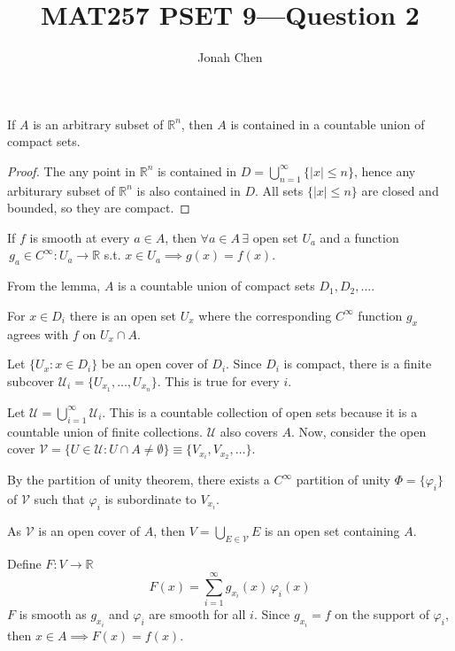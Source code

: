 \documentclass{exam}
\title{MAT257 PSET 9---Question 2}
\author{Jonah Chen}
\date{}
\numberwithin{equation}{section}
\newcommand{\R}{\mathbb{R}}
\begin{document}
    \sffamily
    \maketitle
    \begin{lemma}
        If $A$ is an arbitrary subset of $\R^n$, then $A$ is contained in a countable union of compact sets.
        \begin{proof}
            The any point in $\R^n$ is contained in $D=\bigcup_{n=1}^\infty\{|x|\leq n\}$, hence any arbiturary subset of $\R^n$ is also contained in $D$. All sets $\{|x|\leq n\}$ are closed and bounded, so they are compact.
        \end{proof}
    \end{lemma}
    If $f$ is smooth at every $a\in A$, then $\forall a\in A\,\exists$ open set $U_a$ and a function $\,g_a\in C^\infty:U_a\to\R$ s.t. $x\in U_a\implies g(x)=f(x)$.

    From the lemma, $A$ is a countable union of compact sets $D_1,D_2,\dots$. 
    
    For $x\in D_i$ there is an open set $U_x$ where the corresponding $C^\infty$ function $g_x$ agrees with $f$ on $U_x\cap A$. 
    
    Let $\{U_x:x\in D_i\}$ be an open cover of $D_i$. Since $D_i$ is compact, there is a finite subcover $\mathcal{U}_i=\{U_{x_1},\dots, U_{x_n}\}$. This is true for every $i$.

    Let $\mathcal{U}=\bigcup_{i=1}^\infty\mathcal{U}_i$. This is a countable collection of open sets because it is a countable union of finite collections. $\mathcal{U}$ also covers $A$. Now, consider the open cover $\mathcal{V}=\{U\in\mathcal{U}:U\cap A\neq\emptyset\}\equiv\{V_{x_i},V_{x_2},\dots\}$.   
    
    By the partition of unity theorem, there exists a $C^\infty$ partition of unity $\Phi=\{\varphi_i\}$ of $\mathcal{V}$ such that $\varphi_i$ is subordinate to $V_{x_i}$. 
    
    As $\mathcal{V}$ is an open cover of $A$, then $V=\bigcup_{E\in\mathcal{V}}E$ is an open set containing $A$.
    
    Define $F:V\to\R$ $$F(x)=\sum_{i=1}^\infty g_{x_i}(x)\,\varphi_{i}(x)$$
    $F$ is smooth as $g_{x_i}$ and $\varphi_i$ are smooth for all $i$. Since $g_{x_i}=f$ on the support of $\varphi_i$, then $x\in A\implies F(x)=f(x)$.
\end{document}
